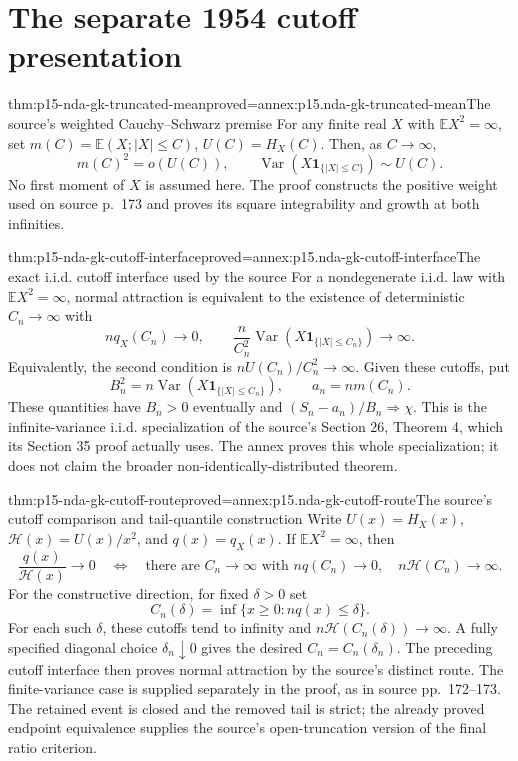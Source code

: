 \section{The separate 1954 cutoff presentation}
\label{sec:p15-nda-gk-source}

\begin{hblemma}{thm:p15-nda-gk-truncated-mean}{proved=annex:p15.nda-gk-truncated-mean}{The source's weighted Cauchy--Schwarz premise}
For any finite real \(X\) with \(\mathbb EX^2=\infty\), set
\(m(C)=\mathbb E(X;|X|\leq C)\), \(U(C)=H_X(C)\).
Then, as \(C\to\infty\),
\[
 m(C)^2=o(U(C)),\qquad
 \operatorname{Var}(X\mathbf1_{\{|X|\leq C\}})\sim U(C).
 \]
No first moment of \(X\) is assumed here.
The proof constructs the positive weight used on source p.~173
and proves its square integrability and growth at both infinities.
\end{hblemma}

\begin{hbtheorem}{thm:p15-nda-gk-cutoff-interface}{proved=annex:p15.nda-gk-cutoff-interface}{The exact i.i.d. cutoff interface used by the source}
For a nondegenerate i.i.d. law with \(\mathbb EX^2=\infty\),
normal attraction is equivalent to the existence of deterministic
\(C_n\to\infty\) with
\[
 n q_X(C_n)\to0,\qquad
 \frac n{C_n^2}
 \operatorname{Var}(X\mathbf1_{\{|X|\leq C_n\}})\to\infty.
 \]
Equivalently, the second condition is \(nU(C_n)/C_n^2\to\infty\).
Given these cutoffs, put
\[
 B_n^2=n\operatorname{Var}(X\mathbf1_{\{|X|\leq C_n\}}),
 \qquad a_n=n m(C_n).
 \]
These quantities have \(B_n>0\) eventually and
\((S_n-a_n)/B_n\Rightarrow\chi\).
This is the infinite-variance i.i.d. specialization of the
source's Section 26, Theorem 4, which its Section 35 proof actually
uses. The annex proves this whole specialization; it does not
claim the broader non-identically-distributed theorem.
\end{hbtheorem}

\begin{hbtheorem}{thm:p15-nda-gk-cutoff-route}{proved=annex:p15.nda-gk-cutoff-route}{The source's cutoff comparison and tail-quantile construction}
Write \(U(x)=H_X(x)\), \(\mathcal H(x)=U(x)/x^2\), and
\(q(x)=q_X(x)\). If \(\mathbb EX^2=\infty\), then
\[
 \frac{q(x)}{\mathcal H(x)}\to0
 \quad\Longleftrightarrow\quad
 \text{there are }C_n\to\infty
 \text{ with }nq(C_n)\to0,\quad n\mathcal H(C_n)\to\infty.
 \]
For the constructive direction, for fixed \(\delta>0\) set
\[
 C_n(\delta)=\inf\{x\geq0:nq(x)\leq\delta\}.
 \]
For each such \(\delta\), these cutoffs tend to infinity and
\(n\mathcal H(C_n(\delta))\to\infty\).
A fully specified diagonal choice \(\delta_n\downarrow0\) gives
the desired \(C_n=C_n(\delta_n)\).
The preceding cutoff interface then proves normal attraction
by the source's distinct route. The finite-variance case is
supplied separately in the proof, as in source pp.~172--173.
The retained event is closed and the removed tail is strict;
the already proved endpoint equivalence supplies the source's
open-truncation version of the final ratio criterion.
\end{hbtheorem}

